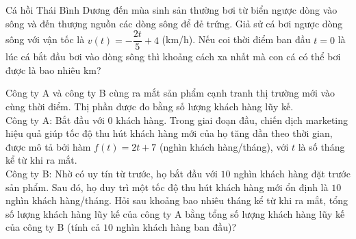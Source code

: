 \begin{bt}%
	Cá hồi Thái Bình Dương đến mùa sinh sản thường bơi từ biển ngược dòng vào sông và đến thượng nguồn các dòng sông để đẻ trứng.  Giả sử cá bơi ngược dòng sông với vận tốc là $ v(t) = -\dfrac{2t}{5} + 4$ (km/h). Nếu coi thời điểm ban đầu $t = 0$ là lúc cá bắt đầu bơi vào dòng sông thì khoảng cách xa nhất mà con cá có thể bơi được là bao nhiêu km?
\end{bt}

\begin{bt}%
	Công ty A và công ty B cùng ra mắt sản phẩm cạnh tranh thị trường mới vào cùng thời điểm. Thị phần được  đo bằng số lượng khách hàng lũy kế.\\
	Công ty A: Bắt đầu với $0$ khách hàng. Trong giai đoạn đầu, chiến dịch marketing hiệu quả giúp tốc độ thu hút khách hàng mới của họ tăng dần theo thời  gian, được mô tả bởi hàm $f(t) = 2t+7$ (nghìn khách hàng/tháng), với $t$ là số tháng kể từ khi ra mắt.\\
	Công ty B: Nhờ có uy tín từ trước, họ bắt đầu với $10$ nghìn khách hàng đặt trước sản phẩm.  Sau đó, họ duy trì một tốc độ thu hút khách hàng mới ổn định là $10$ nghìn khách hàng/tháng.
	Hỏi sau khoảng  bao nhiêu tháng kể từ khi ra mắt, tổng số lượng khách hàng lũy kế của công ty A bằng tổng số lượng khách hàng lũy kế của công ty B (tính cả $10$ nghìn khách hàng ban đầu)?
\end{bt}

